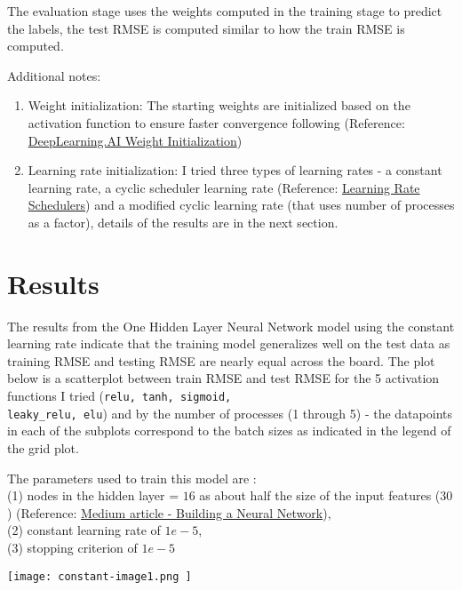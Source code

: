\documentclass{article}
\begin{document}
The evaluation stage uses the weights computed in the training stage to predict the labels, the test RMSE is computed similar to how the train RMSE is computed. 

Additional notes:

\begin{enumerate}
    \item Weight initialization: The starting weights are initialized based on the activation function to ensure faster
    convergence following (Reference: \\ \href{https://www.deeplearning.ai/ai-notes/initialization/index.html}{DeepLearning.AI Weight Initialization})
    \item Learning rate initialization: I tried three types of learning rates - a constant learning rate, a cyclic scheduler learning rate (Reference: \href{https://machinelearningmastery.com/a-gentle-introduction-to-learning-rate-schedulers/}{Learning Rate Schedulers}) and a modified cyclic learning rate (that uses number of processes as a factor), details of the results are in the next section.
\end{enumerate}

\section{Results}
The results from the One Hidden Layer Neural Network model using the constant learning rate indicate that the training model generalizes well on the test data as training RMSE and testing RMSE are nearly equal across the board. The plot below is a scatterplot between train RMSE and test RMSE for the 5 activation functions I tried (\verb|relu, tanh, sigmoid,| \\ \verb|leaky_relu, elu|) and by the number of processes (1 through 5) - the datapoints in each of the subplots correspond to the batch sizes as indicated in the legend of the grid plot.

The parameters used to train this model are : \\
(1) nodes in the hidden layer = $16$ as about half the size of the input features ($30$) (Reference: \href{https://medium.com/data-science/17-rules-of-thumb-for-building-a-neural-network-93356f9930af}{Medium article - Building a Neural Network}), \\
(2) constant learning rate of $1e-5$, \\
(3) stopping criterion of $1e-5$ \\

\begin{center}
\texttt{[image: constant-image1.png ]}
\end{center}
\end{document}
